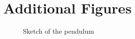 \section{Additional Figures}

\begin{figure}[H]
\caption{Sketch of the pendulum}
\label{fig:pendulum}
\end{figure}
